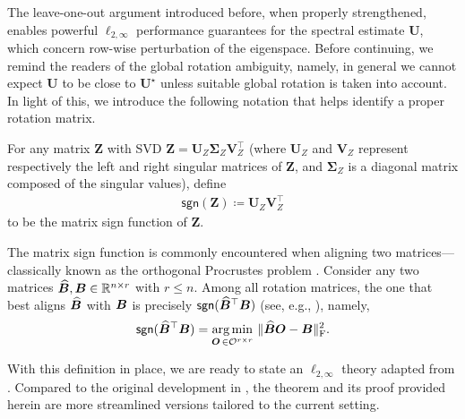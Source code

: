 The leave-one-out argument introduced before, when properly strengthened, enables powerful  $\ell_{2,\infty}$  performance guarantees for the spectral estimate $\bm{U}$, which concern row-wise perturbation of the eigenspace. Before continuing, we remind the readers of the global rotation ambiguity, namely, in general we cannot expect $\bm{U}$  to be close to $\bm{U}^{\star}$ unless suitable global rotation is taken into account. In light of this, we introduce the following notation that helps identify a proper rotation matrix.
%
\begin{definition} For any matrix $\bm{Z}$ with SVD $\bm{Z}=\bm{U}_{Z}\bm{\Sigma}_Z\bm{V}_{Z}^{\top}$ (where $\bm{U}_Z$ and $\bm{V}_Z$ represent respectively the left and right singular matrices of $\bm{Z}$, and $\bm{\Sigma}_Z$ is a diagonal matrix composed of the singular values), define
%
\begin{align}
	\mathsf{sgn}(\bm{Z}) \coloneqq \bm{U}_{Z}  \bm{V}_{Z}^{\top}
	\label{eq:defn-sgn-Z}
\end{align}
%
to be the matrix sign function of $\bm{Z}$.
\end{definition}
%
\begin{remark}
The matrix sign function is commonly encountered when aligning two matrices---classically known as the orthogonal Procrustes problem \citep{schonemann1966generalized}.
Consider any two matrices $\widehat{{\boldsymbol B}},{\boldsymbol B}\in \mathbb{R}^{n\times r}$ with $r\leq n$. Among all rotation matrices,
the one that best aligns  $\widehat {{\boldsymbol B}}$ with ${\boldsymbol B}$ is precisely $ \mathsf{sgn}(\widehat {{\boldsymbol B}}^\top {\boldsymbol B})$ (see, e.g., \citep[Appendix D.2.1]{ma2017implicit}), namely,
$$
	\mathsf{sgn}(\widehat {{\boldsymbol B}}^\top {\boldsymbol B}) = \underset{\bm{O}\,\in \mathcal{O}^{r\times r}}{\arg\min} ~\| \widehat {{\boldsymbol B}} {\bm O} - {\boldsymbol B}\|_{\mathrm{F}}^2.
$$
\end{remark}
%
With this definition in place, we are ready to state an $\ell_{2,\infty}$ theory adapted from \citet{abbe2020entrywise}.
Compared to the original development in \citet{abbe2020entrywise}, 
the theorem and its proof provided herein are more streamlined versions tailored to the current setting. 
%
